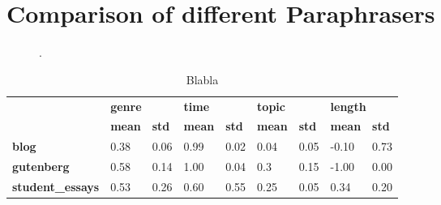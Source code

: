 \section{Comparison of different Paraphrasers}

\begin{figure}[htbp]
    \centering
    
    \caption{.}
    \label{fig:extraction_eval}
\end{figure}

\begin{table}[]
\centering
\caption{Blabla}
\label{tab:extraction_eval_stats}
\begin{tabular}{lllllllll}
\toprule
 &
  \multicolumn{2}{l}{\textbf{genre}} &
  \multicolumn{2}{l}{\textbf{time}} &
  \multicolumn{2}{l}{\textbf{topic}} &
  \multicolumn{2}{l}{\textbf{length}} \\
 &
  \textbf{mean} &
  \textbf{std} &
  \textbf{mean} &
  \textbf{std} &
  \textbf{mean} &
  \textbf{std} &
  \textbf{mean} &
  \textbf{std} \\
  \midrule
\textbf{blog}            & 0.38 & 0.06  & 0.99 & 0.02 & 0.04  & 0.05  & -0.10 & 0.73 \\
\textbf{gutenberg}       & 0.58 & 0.14  & 1.00 & 0.04 & 0.3 & 0.15 & -1.00 & 0.00  \\
\textbf{student\_essays} & 0.53 & 0.26 & 0.60 & 0.55 & 0.25 & 0.05  & 0.34 & 0.20 \\
  \bottomrule
\end{tabular}%
\end{table}